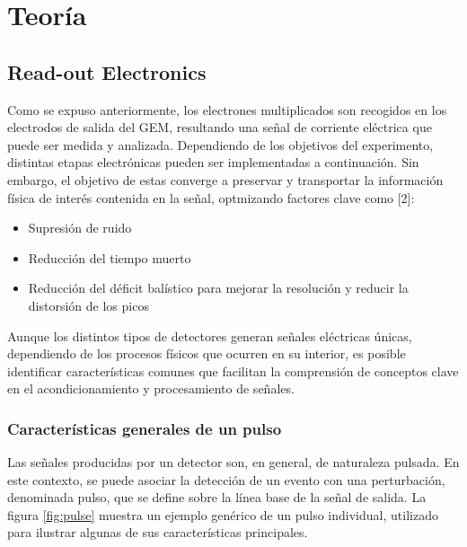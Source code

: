 \documentclass[]{book}
\begin{document}

\chapter*{Teoría}

\section{Read-out Electronics}

\noindent Como se expuso anteriormente, los electrones multiplicados son recogidos en los electrodos de salida del GEM, resultando una señal de corriente eléctrica que puede ser medida y analizada. Dependiendo de los objetivos del experimento, distintas etapas electrónicas pueden ser implementadas a continuación. Sin embargo, el objetivo de estas converge a preservar y transportar la información física de interés contenida en la señal, optmizando factores clave como [2]:

\begin{itemize}
    \item Supresión de ruido 
    \item Reducción del tiempo muerto
    \item Reducción del déficit balístico para mejorar la resolución y reducir la distorsión de los picos
\end{itemize}

\noindent Aunque los distintos tipos de detectores generan señales eléctricas únicas, dependiendo de los procesos físicos que ocurren en su interior, es posible identificar características comunes que facilitan la comprensión de conceptos clave en el acondicionamiento y procesamiento de señales.

\subsection{Características generales de un pulso}

\noindent Las señales producidas por un detector son, en general, de naturaleza pulsada. En este contexto, se puede asociar la detección de un evento con una perturbación, denominada pulso, que se define sobre la línea base de la señal de salida. La figura \ref{fig:pulse} muestra un ejemplo genérico de un pulso individual, utilizado para ilustrar algunas de sus características principales.\\
\end{document}
